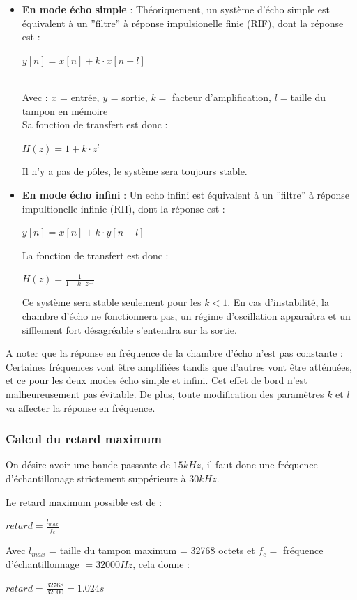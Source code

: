 \documentclass{article}
\begin{document}
\begin{itemize}
\item \textbf{En mode écho simple} : Théoriquement, un système d'écho simple est équivalent à un ''filtre'' à réponse impulsionelle finie (RIF), dont la réponse est :
\begin{center}$y[n] = x[n] + k \cdot x[n-l]$ \end{center}\textbf{}\\
Avec : $x$ = entrée, $y$ = sortie, $k = $ facteur d'amplification, $l = $taille du tampon en mémoire\\

Sa fonction de transfert est donc :
\begin{center}$H(z) = 1 + k \cdot z^l$\end{center}

Il n'y a pas de pôles, le système sera toujours stable.

\item \textbf{En mode écho infini} : Un echo infini est équivalent à un ''filtre'' à réponse impultionelle infinie (RII), dont la réponse est :
\begin{center}$y[n] = x[n] + k \cdot y[n-l]$\end{center}

La fonction de transfert est donc :
\begin{center}$H(z) = \frac{1}{1 - k \cdot z^{-l}}$\end{center}
Ce système sera stable seulement pour les $k<1$. En cas d'instabilité, la chambre d'écho ne fonctionnera pas, un régime d'oscillation apparaîtra et un sifflement fort désagréable s'entendra sur la sortie.
\end{itemize}

A noter que la réponse en fréquence de la chambre d'écho n'est pas constante : Certaines fréquences vont être amplifiées tandis que d'autres vont être atténuées, et ce pour les deux modes écho simple et infini. Cet effet de bord n'est malheureusement pas évitable. De plus, toute modification des paramètres $k$ et $l$ va affecter la réponse en fréquence.

\subsubsection{Calcul du retard maximum}
On désire avoir une bande passante de $15 kHz$, il faut donc une fréquence d'échantillonage strictement suppérieure à $30 kHz$.

Le retard maximum possible est de :
\begin{center}$retard = \frac{l_{max}}{f_e}$\end{center}
Avec $l_{max}$ = taille du tampon maximum = 32768 octets et $f_e = $ fréquence d'échantillonnage $= 32000 Hz$, cela donne :
\begin{center}$retard = \frac{32768}{32000} = 1.024 s$\textbf{}\end{center}
\end{document}
